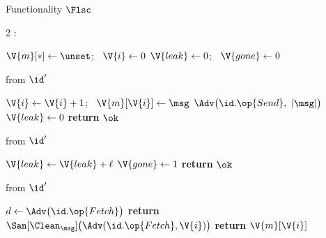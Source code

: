 \begin{interface}[nofloat]{Functionality $\Flsc$ \\
}

{\scriptsize
\setlength{\columnsep}{1.4em}
\begin{multicols}{2}
:
\begin{algorithmic}[1]
\setcounter{contline}{0}\algcont
\State $\V{m}[*] \gets \unset$; \ $\V{i} \gets 0$
\State $\V{leak} \gets 0$; \ $\V{gone} \gets 0$
\algsave
\end{algorithmic}
\vspace{1.4ex}

 \quad from $\id'$
\begin{algorithmic}[1]
\algcont
{}
\State $\V{i} \gets \V{i} + 1$; \ $\V{m}[\V{i}] \gets \msg$
\State $\Adv\bigl(\id.\op{Send},\ |\msg|\bigr)$ \label{ln:lscsecrecy}
\State $\V{leak} \gets 0$ \label{ln:lscreset}
\State \textbf{return} $\ok$
\algsave
\end{algorithmic}
\vspace{1.4ex}

 \quad from $\id'$
\begin{algorithmic}[1]
\algcont
{}
\State $\V{leak} \gets \V{leak} + \ell$ \label{ln:lsccount}
 \label{ln:lsccross}
  \State $\V{gone} \gets 1$ \label{ln:lscgiveup}
\EndIf
\State \textbf{return} $\ok$
\algsave
\end{algorithmic}
\vspace{1.4ex}

\columnbreak

 \quad from $\id'$
\begin{algorithmic}[1]
\algcont
{}
\State $d \gets \Adv\bigl(\id.\op{Fetch}\bigr)$ \label{ln:lscdeliver}
 \label{ln:lscsub}
  \State \textbf{return} $\San[\Clean_{\msg}]\bigl(\Adv(\id.\op{Fetch}, \V{i})\bigr)$ \label{ln:lscforge}
\EndIf
\State \textbf{return} $\V{m}[\V{i}]$ \label{ln:lscout}
\algsave
\end{algorithmic}
\vspace{1.4ex}


\end{multicols}}
\end{interface}
